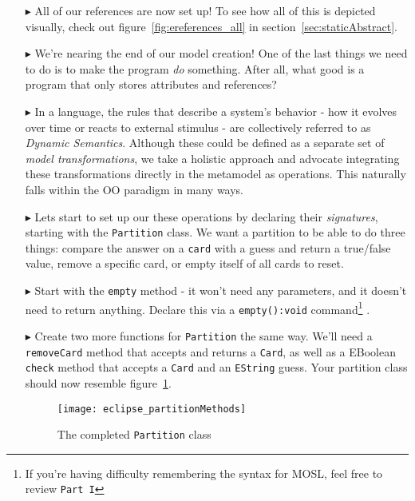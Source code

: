 \begin{itemize}
\item[$\blacktriangleright$] All of our references are now set up! To see how all of this is depicted visually, check out figure~\ref{fig:ereferences_all} in
section~\ref{sec:staticAbstract}.

\pagebreak

\item[$\blacktriangleright$] We're nearing the end of our model creation! One of the last things we need to do is to make the program \emph{do} something. After
all, what good is a program that only stores attributes and references?

\item[$\blacktriangleright$] In a language, the rules that describe a system's behavior - how it evolves over time or reacts to external stimulus - are
collectively referred to as \emph{Dynamic Semantics}. Although these could be defined as a separate set of \emph{model
transformations}, we take a holistic approach and advocate integrating these transformations directly in the metamodel as operations. This naturally falls
within the OO paradigm in many ways.

\item[$\blacktriangleright$] Lets start to set up our these operations by declaring their \emph{signatures}, starting with the \texttt{Partition} class. We want
a partition to be able to do three things: compare the answer on a \texttt{card} with a guess and return a true/false value, remove a specific card, or empty
itself of all cards to reset.

\item[$\blacktriangleright$] Start with the \texttt{empty} method - it won't need any parameters, and it doesn't need to return anything. Declare this via a
\texttt{empty():void} command\footnote{If you're having difficulty remembering the syntax for MOSL, feel free to review \mbox{\texttt{Part I}}} .

\item[$\blacktriangleright$] Create two more functions for \texttt{Partition} the same way. We'll need a \texttt{removeCard} method that accepts and returns a
\texttt{Card}, as well as a EBoolean \texttt{check} method that accepts a \texttt{Card} and an \texttt{EString} guess. Your partition class should now resemble
figure~\ref{fig:partitionMethods}.

\begin{figure}[htbp]
	\centering
  \texttt{[image: eclipse\_partitionMethods]}
	\caption{The completed \texttt{Partition} class}
	\label{fig:partitionMethods}
\end{figure}


\end{itemize}
